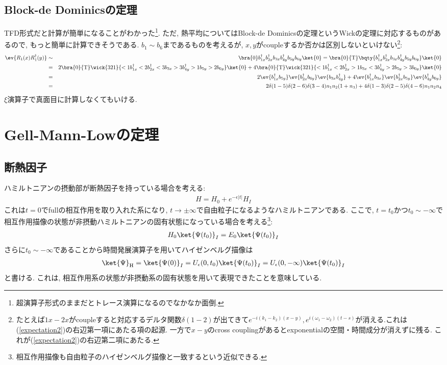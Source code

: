 \subsection{Block-de Dominicsの定理}
TFD形式だと計算が簡単になることがわかった\footnote{超演算子形式のままだとトレース演算になるのでなかなか面倒. }. ただ, 熱平均についてはBlock-de Dominicsの定理というWickの定理に対応するものがあるので, もっと簡単に計算できそうである. $b_1\sim b_6$まであるものを考えるが, $x, y$がcoupleするか否かは区別しないといけない\footnote{たとえば$1x-2x$がcoupleすると対応するデルタ関数$\delta(1-2)$が出てきて$e^{-i(k_1 - k_2)(x-y)}, e^{i(\omega_1 - \omega_2)(t-s)}$が消える.これは(\ref{expectation2})の右辺第一項にあたる項の起源. 一方で$x-y$のcross couplingがあるとexponentialの空間・時間成分が消えずに残る. これが(\ref{expectation2})の右辺第二項にあたる.}:
\begin{eqnarray}
  \ev{R_1(x)R_1^\dagger(y)} &\sim& \bra{0}b_{1x}^\dagger b^\dagger_{2x} b_{3x} b^\dagger_{4y} b_{5y} b_{6y} \ket{0} =\bra{0}{\rm T} \bqty{b_{1x}^\dagger b^\dagger_{2x} b_{3x} b^\dagger_{4y} b_{5y} b_{6y} }\ket{0}\\
  &=& 2\bra{0}{\rm T}\wick{321}{<1b_{1x}^\dagger <2b^\dagger_{2x} <3b_{3x} >3b^\dagger_{4y} >1b_{5y} >2b_{6y} }\ket{0} + 4\bra{0}{\rm T}\wick{321}{<1b_{1x}^\dagger <2b^\dagger_{2x} >1b_{3x} <3b^\dagger_{4y} >2b_{5y} >3b_{6y} }\ket{0}\\
  &=&2\ev{b^\dagger_{1x}b_{5y}}\ev{b^\dagger_{2x}b_{6y}}\ev{b_{3x}b^\dagger_{4y}} + 4\ev{b^\dagger_{1x}b_{3x}}\ev{b^\dagger_{2x}b_{5y}}\ev{b^\dagger_{4y}b_{6y}}\\
  \nonumber  &=& 2\delta(1-5)\delta(2-6)\delta(3-4)n_1n_2(1+n_3) + 4\delta(1-3)\delta(2-5)\delta(4-6)n_1n_2n_4\\
\end{eqnarray}
$\xi$演算子で真面目に計算しなくてもいける. 
\section{Gell-Mann-Lowの定理}
\subsection{断熱因子}
ハミルトニアンの摂動部が断熱因子を持っている場合を考える:
\begin{eqnarray}
  H = H_0 + e^{-\epsilon|t|}H_I
\end{eqnarray}
これは$t = 0$でfullの相互作用を取り入れた系になり, $t \rightarrow \pm\infty$で自由粒子になるようなハミルトニアンである. ここで, $t = t_0$かつ$t_0 \sim -\infty$で相互作用描像の状態が非摂動ハミルトニアンの固有状態になっている場合を考える\footnote{相互作用描像も自由粒子のハイゼンベルグ描像と一致するという近似できる. }:
\begin{eqnarray}
  H_0\ket{\Psi(t_0)}_I = E_0\ket{\Psi(t_0)}_I
\end{eqnarray}
さらに$t_0 \sim -\infty$であることから時間発展演算子を用いてハイゼンベルグ描像は
\begin{eqnarray}
  \ket{\Psi}_{\rm H} =  \ket{\Psi(0)}_I = U_\epsilon(0, t_0)\ket{\Psi(t_0)}_I= U_\epsilon(0, -\infty)\ket{\Psi(t_0)}_I\label{5eq1}
\end{eqnarray}
と書ける. これは, 相互作用系の状態が非摂動系の固有状態を用いて表現できたことを意味している.

